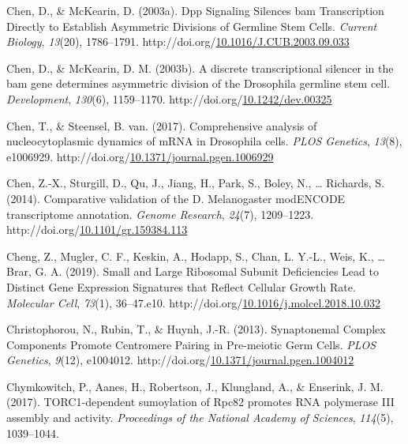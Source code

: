 \documentclass[12pt,oneside]{reedthesis}
\newlength{\cslhangindent}
\newenvironment{CSLReferences}[2] %
 {%
  \setlength{\parindent}{0pt}
  \ifodd #1 \everypar{\setlength{\hangindent}{\cslhangindent}}\ignorespaces\fi
  \ifnum #2 > 0
  \setlength{\parskip}{#2\baselineskip}
  \fi
 }%
 {}
\begin{document}
\begin{CSLReferences}{1}{0}
\leavevmode{}%
Chen, D., \& McKearin, D. (2003a). Dpp {Signaling Silences} bam {Transcription Directly} to {Establish Asymmetric Divisions} of {Germline Stem Cells}. \emph{Current Biology}, \emph{13}(20), 1786--1791. http://doi.org/\href{https://doi.org/10.1016/J.CUB.2003.09.033}{10.1016/J.CUB.2003.09.033}

\leavevmode{}%
Chen, D., \& McKearin, D. M. (2003b). A discrete transcriptional silencer in the bam gene determines asymmetric division of the {Drosophila} germline stem cell. \emph{Development}, \emph{130}(6), 1159--1170. http://doi.org/\href{https://doi.org/10.1242/dev.00325}{10.1242/dev.00325}

\leavevmode{}%
Chen, T., \& Steensel, B. van. (2017). Comprehensive analysis of nucleocytoplasmic dynamics of {mRNA} in {Drosophila} cells. \emph{PLOS Genetics}, \emph{13}(8), e1006929. http://doi.org/\href{https://doi.org/10.1371/journal.pgen.1006929}{10.1371/journal.pgen.1006929}

\leavevmode{}%
Chen, Z.-X., Sturgill, D., Qu, J., Jiang, H., Park, S., Boley, N., \ldots{} Richards, S. (2014). Comparative validation of the {D}. Melanogaster {modENCODE} transcriptome annotation. \emph{Genome Research}, \emph{24}(7), 1209--1223. http://doi.org/\href{https://doi.org/10.1101/gr.159384.113}{10.1101/gr.159384.113}

\leavevmode{}%
Cheng, Z., Mugler, C. F., Keskin, A., Hodapp, S., Chan, L. Y.-L., Weis, K., \ldots{} Brar, G. A. (2019). Small and {Large Ribosomal Subunit Deficiencies Lead} to {Distinct Gene Expression Signatures} that {Reflect Cellular Growth Rate}. \emph{Molecular Cell}, \emph{73}(1), 36--47.e10. http://doi.org/\href{https://doi.org/10.1016/j.molcel.2018.10.032}{10.1016/j.molcel.2018.10.032}

\leavevmode{}%
Christophorou, N., Rubin, T., \& Huynh, J.-R. (2013). Synaptonemal {Complex Components Promote Centromere Pairing} in {Pre-meiotic Germ Cells}. \emph{PLOS Genetics}, \emph{9}(12), e1004012. http://doi.org/\href{https://doi.org/10.1371/journal.pgen.1004012}{10.1371/journal.pgen.1004012}

\leavevmode{}%
Chymkowitch, P., Aanes, H., Robertson, J., Klungland, A., \& Enserink, J. M. (2017). {TORC1-dependent} sumoylation of {Rpc82} promotes {RNA} polymerase {III} assembly and activity. \emph{Proceedings of the National Academy of Sciences}, \emph{114}(5), 1039--1044.


\end{CSLReferences}
\end{document}
